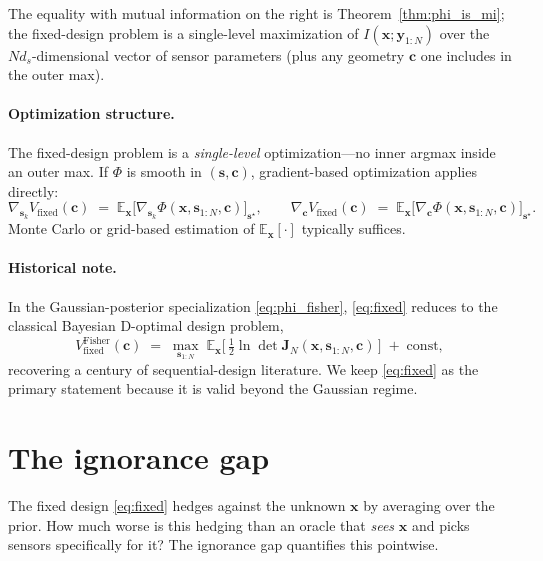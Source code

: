 \documentclass[11pt,a4paper]{article}
\newcommand{\E}{\mathbb{E}}
\begin{document}
The equality with mutual information on the right is Theorem~\ref{thm:phi_is_mi}; the fixed-design problem is a single-level maximization of $I(\bm{x};\bm{y}_{1:N})$ over the $N d_s$-dimensional vector of sensor parameters (plus any geometry $\bm{c}$ one includes in the outer max).

\paragraph{Optimization structure.}
The fixed-design problem is a \emph{single-level} optimization---no inner argmax inside an outer max.  If $\Phi$ is smooth in $(\bm{s}, \bm{c})$, gradient-based optimization applies directly:
\begin{equation}
  \nabla_{\bm{s}_k} V_{\mathrm{fixed}}(\bm{c}) \;=\; \E_{\bm{x}}\!\bigl[\nabla_{\bm{s}_k} \Phi(\bm{x}, \bm{s}_{1:N}, \bm{c})\bigr]_{\bm{s}^\star},
  \qquad
  \nabla_{\bm{c}} V_{\mathrm{fixed}}(\bm{c}) \;=\; \E_{\bm{x}}\!\bigl[\nabla_{\bm{c}} \Phi(\bm{x}, \bm{s}_{1:N}, \bm{c})\bigr]_{\bm{s}^\star}.
\end{equation}
Monte Carlo or grid-based estimation of $\E_{\bm{x}}[\cdot]$ typically suffices.

\paragraph{Historical note.}
In the Gaussian-posterior specialization \eqref{eq:phi_fisher}, \eqref{eq:fixed} reduces to the classical Bayesian D-optimal design problem,
\begin{equation}
  V_{\mathrm{fixed}}^{\text{Fisher}}(\bm{c}) \;=\; \max_{\bm{s}_{1:N}} \; \E_{\bm{x}}\!\bigl[\,\tfrac{1}{2}\ln\det \bm{J}_N(\bm{x}, \bm{s}_{1:N}, \bm{c})\,\bigr] \;+\; \mathrm{const},
  \label{eq:joint_opt}
\end{equation}
recovering a century of sequential-design literature.  We keep \eqref{eq:fixed} as the primary statement because it is valid beyond the Gaussian regime.

\section{The ignorance gap}
\label{sec:ig}

The fixed design \eqref{eq:fixed} hedges against the unknown $\bm{x}$ by averaging over the prior.  How much worse is this hedging than an oracle that \emph{sees} $\bm{x}$ and picks sensors specifically for it?  The ignorance gap quantifies this pointwise.
\end{document}
